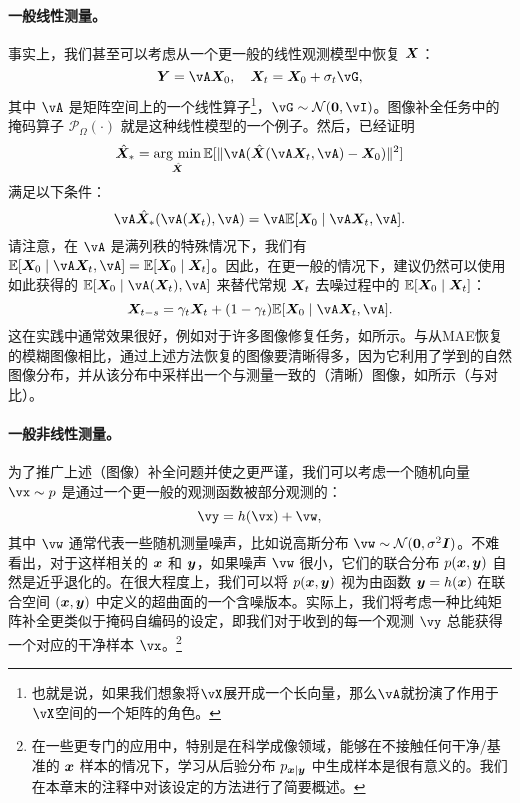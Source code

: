 \documentclass[../../book-main.tex]{subfiles}
\begin{document}
\paragraph{一般线性测量。} 
事实上，我们甚至可以考虑从一个更一般的线性观测模型中恢复 $\bm{X}$：
\begin{equation}
    \Y = \vA\X_0,  \quad \X_t = \X_0 + \sigma_t \vG,  
\end{equation}
其中 $\vA$ 是矩阵空间上的一个线性算子\footnote{也就是说，如果我们想象将\(\vX\)展开成一个长向量，那么\(\vA\)就扮演了作用于\(\vX\)空间的一个矩阵的角色。}，$\vG \sim \mathcal{N}(\boldsymbol{0}, \vI)$。图像补全任务中的掩码算子 $\mathcal{P}_{\Omega}(\cdot)$ 就是这种线性模型的一个例子。然后，\cite{daras2023ambient}已经证明
\begin{equation}
    \hat{\X}_* = \argmin_{\hat{\X}} \mathbb{E}[\|\vA(\hat{\X}(\vA\X_t, \vA) - \X_0)\|^2]
\end{equation}
满足以下条件：
\begin{equation}
    \vA \hat{\X}_*(\vA(\X_t), \vA) = \vA \mathbb{E}[\X_0 \mid \vA \X_t, \vA].
\end{equation} 
请注意，在 $\vA$ 是满列秩的特殊情况下，我们有 $ \mathbb{E}[\X_0 \mid \vA\X_t, \vA] = \mathbb{E}[\X_0 \mid \X_t]$。因此，在更一般的情况下，\cite{daras2023ambient}建议仍然可以使用如此获得的 $\mathbb{E}[\X_0 \mid \vA(\X_t), \vA]$ 来替代常规 $\bm{X}_t$ 去噪过程中的 $\mathbb{E}[\bm{X}_0 \mid \bm{X}_t]$：
\begin{equation}
    \X_{t-s} = \gamma_t \X_t + (1-\gamma_t) \mathbb{E}[\X_0 \mid \vA\X_t, \vA].
\end{equation}
这在实践中通常效果很好，例如对于许多图像修复任务，如\cite{daras2023ambient}所示。与从MAE恢复的模糊图像相比，通过上述方法恢复的图像要清晰得多，因为它利用了学到的自然图像分布，并从该分布中采样出一个与测量一致的（清晰）图像，如所示（与对比）。


\paragraph{一般非线性测量。}
为了推广上述（图像）补全问题并使之更严谨，我们可以考虑一个随机向量 $\vx \sim p$ 是通过一个更一般的观测函数被部分观测的：
\begin{equation}\label{eq:measurement-matching-observation}
\vy = h(\vx) + \vw,
\end{equation}
其中 $\vw$ 通常代表一些随机测量噪声，比如说高斯分布 $\vw \sim \mathcal{N}(\mathbf{0}, \sigma^2 \boldsymbol{I})$。不难看出，对于这样相关的 $\bm{x}$ 和 $\bm{y}$，如果噪声 $\vw$ 很小，它们的联合分布 $p(\bm{x}, \bm{y})$ 自然是近乎退化的。在很大程度上，我们可以将 $p(\bm{x}, \bm{y})$ 视为由函数 $\bm{y} = h(\bm{x})$ 在联合空间 $(\bm{x}, \bm{y})$ 中定义的超曲面的一个含噪版本。实际上，我们将考虑一种比纯矩阵补全更类似于掩码自编码的设定，即我们对于收到的每一个观测 $\vy$ 总能获得一个对应的干净样本 $\vx$。\footnote{在一些更专门的应用中，特别是在科学成像领域，能够在不接触任何干净/基准的 $\bm{x}$ 样本的情况下，学习从后验分布 $p_{\bm{x} \mid \bm{y}}$ 中生成样本是很有意义的。我们在本章末的注释中对该设定的方法进行了简要概述。}
\end{document}
